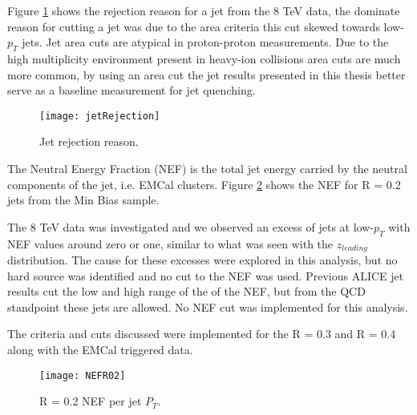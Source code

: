 Figure \ref{fig:jetRejection} shows the rejection reason for a jet from the 8 TeV data, the dominate reason for cutting a jet was due to the area criteria this cut skewed towards low-$p_{T}$ jets.  Jet area cuts are atypical in proton-proton measurements.  Due to the high multiplicity environment present in heavy-ion collisions area cuts are much more common, by using an area cut the jet results presented in this thesis better serve as a baseline measurement for jet quenching.

\begin{figure}[h]
\texttt{[image: jetRejection]}
\centering
\caption{Jet rejection reason.}
\label{fig:jetRejection}
\end{figure}


The Neutral Energy Fraction (NEF) is the total jet energy carried by the neutral components of the jet, i.e. EMCal clusters.  Figure \ref{fig:JetNEF} shows the NEF for R = 0.2 jets from the Min Bias sample.

The 8 TeV data was investigated and we observed an excess of jets at low-$p_{T}$ with NEF values around zero or one, similar to what was seen with the $z_{leading}$ distribution.  The cause for these excesses were explored in this analysis, but no hard source was identified and no cut to the NEF was used.  Previous ALICE jet results cut the low and high range of the of the NEF, but from the QCD standpoint these jets are allowed.  No NEF cut was implemented for this analysis.

The criteria and cuts discussed were implemented for the R = 0.3 and R = 0.4 along with the EMCal triggered data.

\begin{figure}[h]
\texttt{[image: NEFR02]}
\centering
\caption{R = 0.2 NEF per jet $P_{T}$.}
\label{fig:JetNEF}
\end{figure}




